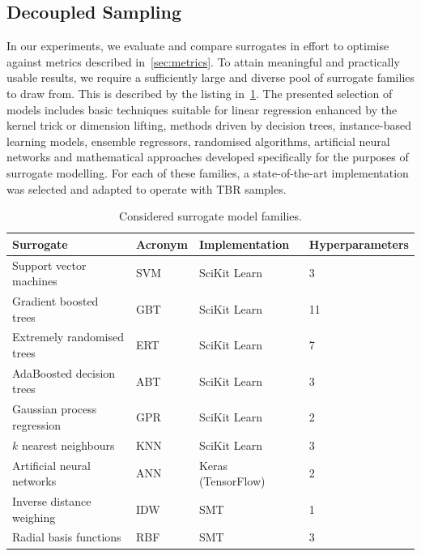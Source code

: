 \subsection{Decoupled Sampling}
\label{sec:supervised}

In our experiments, we evaluate and compare surrogates in effort to
optimise against metrics described in~\cref{sec:metrics}. To attain meaningful
and practically usable results, we require a sufficiently large and diverse pool
of surrogate families to draw from. This is described by the listing in~\cref{tbl:surrogates}. The presented selection of models includes basic
techniques suitable for linear regression enhanced by the kernel trick or dimension
lifting, methods driven by decision trees, instance-based learning models,
ensemble regressors, randomised algorithms, artificial neural networks and mathematical approaches
developed specifically for the purposes of surrogate modelling. For each of
these families, a state-of-the-art implementation was selected and adapted to
operate with TBR samples.

\begin{table}[h]
	\centering
	{\footnotesize
		\begin{tabular}{llll}
		\toprule
		Surrogate & Acronym & Implementation & Hyperparameters \\
		\midrule
		Support vector machines~\cite{fan2008liblinear}	& SVM & SciKit Learn~\cite{scikit-learn} & 3 \\
		Gradient boosted trees~\cite{friedman2001greedy,friedman1999stochastic,hastie2009elements}	& GBT & SciKit Learn & 11 \\
		Extremely randomised trees~\cite{geurts2006extremely}	& ERT & SciKit Learn & 7 \\
		AdaBoosted decision trees~\cite{drucker1997improving}	& ABT & SciKit Learn & 3 \\
		Gaussian process regression~\cite{williams2006gaussian}	& GPR & SciKit Learn & 2 \\
		$k$ nearest neighbours	& KNN & SciKit Learn & 3 \\
		Artificial neural networks	& ANN & Keras (TensorFlow)~\cite{chollet2015keras} & 2 \\
		Inverse distance weighing~\cite{shepard1968two} & IDW & SMT~\cite{SMT2019} & 1 \\
		Radial basis functions & RBF & SMT & 3 \\
		\bottomrule
		\end{tabular}
	}
	\caption{Considered surrogate model families.}
	\label{tbl:surrogates}
\end{table}

